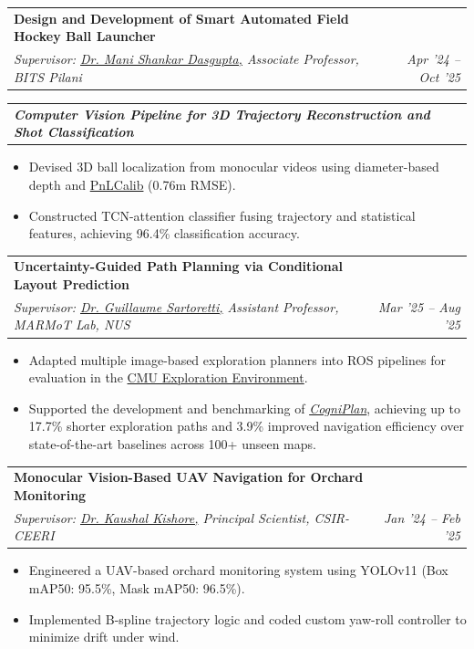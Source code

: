\documentclass[letterpaper,10pt]{article}
\makeatletter
\newcommand{\resumeItem}[1]{
  \item \small{#1\vspace{-2pt}}
}
\newcommand{\resumeSubheading}[4]{
  \vspace{0pt}\item
  \begin{tabular*}{0.97\textwidth}[t]{l@{\extracolsep{\fill}}r}
    \textbf{#1} & \textbf{#2} \\
    \textit{\small #3} & \textit{\small #4} \\
  \end{tabular*}\vspace{-6pt}
}
\newcommand{\resumeSubSubheading}[2]{
  \vspace{0pt}\item
  \begin{tabular*}{0.97\textwidth}[t]{l@{\extracolsep{\fill}}r}
    \textit{\small #1} & \textit{\small #2} \\
  \end{tabular*}\vspace{-6pt}
}
\newcommand{\resumeItemListStart}{
  \begin{itemize}[leftmargin=0.18in]
}
\newcommand{\resumeItemListEnd}{
  \end{itemize}\vspace{-6pt}
}
\makeatother
\begin{document}
  \resumeSubheading
    {Design and Development of Smart Automated Field Hockey Ball Launcher \color{blue}\href{https://drive.google.com/file/d/1h7X9fIiih37ivgERVR-wbWsDEil0qvpI/view?usp=drive_link}{\faExternalLink*}}{}
    {Supervisor: {\color{blue}\href{https://www.bits-pilani.ac.in/pilani/m-s-dasgupta/}{Dr. Mani Shankar Dasgupta,}} Associate Professor, BITS Pilani}{Apr '24 – Oct '25}

    \resumeSubSubheading
      {\textbf{\hspace{4pt}Computer Vision Pipeline for 3D Trajectory Reconstruction and Shot Classification}}{}
    \resumeItemListStart
      \resumeItem{Devised 3D ball localization from monocular videos using diameter-based depth and {\color{blue}\href{https://github.com/mguti97/PnLCalib}{PnLCalib}}  (0.76m RMSE).}
      \resumeItem{Constructed TCN-attention classifier fusing trajectory and statistical features, achieving 96.4\% classification accuracy.}
    \resumeItemListEnd

  \resumeSubheading
    {Uncertainty-Guided Path Planning via Conditional Layout Prediction \color{blue}\href{https://yizhuo-wang.com/cogniplan/}{\faExternalLink*}}{}
    {Supervisor: {\color{blue}\href{https://cde.nus.edu.sg/me/staff/sartoretti-guillaume-a/}{Dr. Guillaume Sartoretti,}} Assistant Professor, MARMoT Lab, NUS}{Mar '25 – Aug '25}
  \resumeItemListStart
    \resumeItem{Adapted multiple image-based exploration planners into ROS pipelines for evaluation in the \color{blue}\href{https://www.cmu-exploration.com/}{CMU Exploration Environment}.}
    \resumeItem{Supported the development and benchmarking of \textit{\color{blue}\href{https://yizhuo-wang.com/cogniplan/}{CogniPlan}}, achieving up to 17.7\% shorter exploration paths and 3.9\% improved navigation efficiency over state-of-the-art baselines across 100+ unseen maps.}
  \resumeItemListEnd

  \resumeSubheading
    {Monocular Vision-Based UAV Navigation for Orchard Monitoring \color{blue}\href{https://github.com/robotics1106/Monocular-Vision-Based-UAV-Navigation-for-Orchard-Monitoring.git}{\faExternalLink*}}{}
    {Supervisor: {\color{blue}\href{https://ieeexplore.ieee.org/author/37085653936}{Dr. Kaushal Kishore,}} Principal Scientist, CSIR-CEERI}{Jan '24 – Feb '25}
  \resumeItemListStart
    \resumeItem{Engineered a UAV-based orchard monitoring system using YOLOv11 (Box mAP50: 95.5\%, Mask mAP50: 96.5\%).}
    \resumeItem{Implemented B-spline trajectory logic and coded custom yaw-roll controller to minimize drift under wind.}
  \resumeItemListEnd
\end{document}
